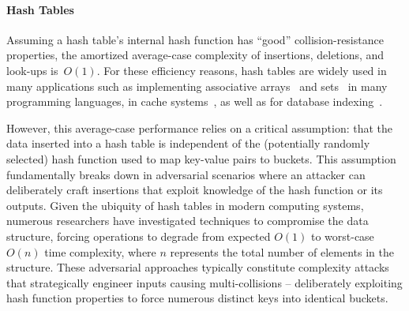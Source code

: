 \paragraph{Hash Tables} Assuming a hash table's internal hash function has ``good'' collision-resistance properties, the amortized average-case complexity of insertions, deletions, and look-ups is~$O(1)$. For these efficiency reasons, hash tables are widely used in many applications such as implementing associative arrays~\cite{mehlhorn2008hash} and sets~\cite{blandy2021programming} in many programming languages, in cache systems~\cite{istvan2015hash}, as well as for database indexing~\cite{zobel2001memory}.

However, this average-case performance relies on a critical assumption: that the data inserted into a hash table is independent of the (potentially randomly selected) hash function used to map key-value pairs to buckets. This assumption fundamentally breaks down in adversarial scenarios where an attacker can deliberately craft insertions that exploit knowledge of the hash function or its outputs. Given the ubiquity of hash tables in modern computing systems, numerous researchers \cite{paxson1999bro, CrosbyW03, bar2007remote, eckhoff2009hash, klink2011efficient, aumasson2012hash,bottinelli2025hash} have investigated techniques to compromise the data structure, forcing operations to degrade from expected $O(1)$ to worst-case $O(n)$ time complexity, where $n$ represents the total number of elements in the structure. These adversarial approaches typically constitute complexity attacks that strategically engineer inputs causing multi-collisions -- deliberately exploiting hash function properties to force numerous distinct keys into identical buckets.

